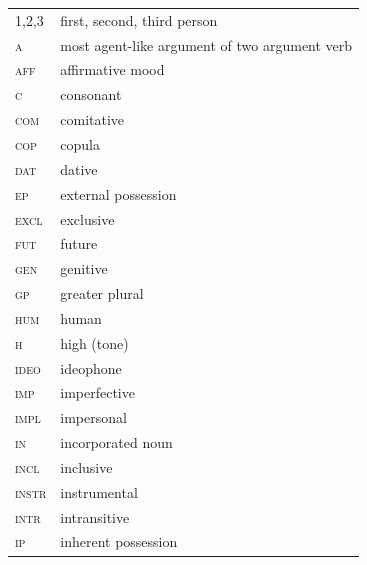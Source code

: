\documentclass[output=paper]{langsci/langscibook}
\begin{document}
\begin{tabularx}{.45\textwidth}{lX}

1,2,3	&  first, second, third person \\

\textsc{a}   &  most agent-like argument of two argument verb \\

\textsc{aff}  &   affirmative mood \\

\textsc{c}  &  consonant \\

\textsc{com}   & comitative \\

\textsc{cop}  &  copula \\

\textsc{dat}  &   dative \\

\textsc{ep}  &   external possession \\

\textsc{excl}  &   exclusive \\

\textsc{fut}  &  future \\

\textsc{gen}  &  genitive \\

\textsc{gp}  &  greater plural \\

\textsc{hum}  &  human \\

\textsc{h} &   high (tone) \\

\textsc{ideo} &   ideophone \\

\textsc{imp}  &  imperfective \\

\textsc{impl}  &  impersonal \\

\textsc{in}   &  incorporated noun \\

\textsc{incl }  &  inclusive \\

\textsc{instr }  &  instrumental \\

\textsc{intr}  &   intransitive \\

\textsc{ip}  &  inherent possession \\


\end{tabularx}
\end{document}
